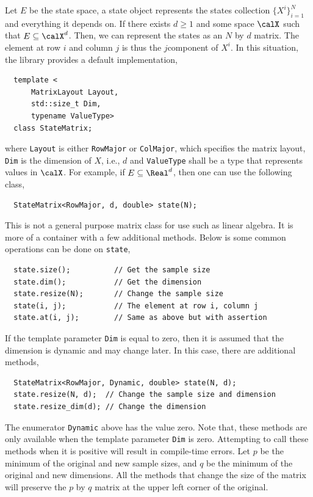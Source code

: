 Let $E$ be the state space, a state object represents the states collection
$\{X^i\}_{i=1}^N$ and everything it depends on. If there exists $d\ge1$ and
some space $\calX$ such that $E\subseteq\calX^d$. Then, we can represent the
states as an $N$ by $d$ matrix. The element at row $i$ and column $j$ is thus
the $j$\ith component of $X^i$. In this situation, the library provides a
default implementation,
\begin{Verbatim}
  template <
      MatrixLayout Layout,
      std::size_t Dim,
      typename ValueType>
  class StateMatrix;
\end{Verbatim}
where \verb|Layout| is either \verb|RowMajor| or \verb|ColMajor|, which
specifies the matrix layout, \verb|Dim| is the dimension of $X$, i.e., $d$ and
\verb|ValueType| shall be a \cpp type that represents values in $\calX$. For
example, if $E\subseteq\Real^d$, then one can use the following class,
\begin{Verbatim}
  StateMatrix<RowMajor, d, double> state(N);
\end{Verbatim}
This is not a general purpose matrix class for use such as linear algebra. It
is more of a container with a few additional methods. Below is some common
operations can be done on \verb|state|,
\begin{Verbatim}
  state.size();          // Get the sample size
  state.dim();           // Get the dimension
  state.resize(N);       // Change the sample size
  state(i, j);           // The element at row i, column j
  state.at(i, j);        // Same as above but with assertion
\end{Verbatim}
If the template parameter \verb|Dim| is equal to zero, then it is assumed that
the dimension is dynamic and may change later. In this case, there are
additional methods,
\begin{Verbatim}
  StateMatrix<RowMajor, Dynamic, double> state(N, d);
  state.resize(N, d);  // Change the sample size and dimension
  state.resize_dim(d); // Change the dimension
\end{Verbatim}
The enumerator \verb|Dynamic| above has the value zero. Note that, these
methods are only available when the template parameter \verb|Dim| is zero.
Attempting to call these methods when it is positive will result in
compile-time errors. Let $p$ be the minimum of the original and new sample
sizes, and $q$ be the minimum of the original and new dimensions. All the
methods that change the size of the matrix will preserve the $p$ by $q$ matrix
at the upper left corner of the original.

